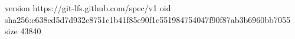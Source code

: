 version https://git-lfs.github.com/spec/v1
oid sha256:c638ed5d7d932c8751c1b41f85e90f1e551984754047f90f87ab3b6960bb7055
size 43840
